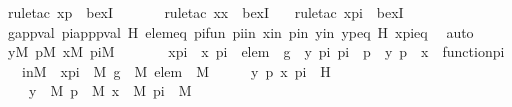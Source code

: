 \begin{isabellebody}
\ {\isacharparenleft}{\kern0pt}rule{\isacharunderscore}{\kern0pt}tac\ x{\isacharequal}{\kern0pt}p\ \ bexI{\isacharparenright}{\kern0pt}\ \isanewline
\ \ \ \ \isamarkupfalse%
\ {\isacharparenleft}{\kern0pt}rule{\isacharunderscore}{\kern0pt}tac\ x{\isacharequal}{\kern0pt}x\ \ bexI{\isacharparenright}{\kern0pt}\ \ \isamarkupfalse%
\ {\isacharparenleft}{\kern0pt}rule{\isacharunderscore}{\kern0pt}tac\ x{\isacharequal}{\kern0pt}pi\ \ bexI{\isacharparenright}{\kern0pt}\isanewline
\ \ \ \ \isamarkupfalse%
\ g{\isacharunderscore}{\kern0pt}app{\isacharunderscore}{\kern0pt}val\ pi{\isacharunderscore}{\kern0pt}app{\isacharunderscore}{\kern0pt}p{\isacharunderscore}{\kern0pt}val\ H\ elemeq\ pifun\ piin\ xin\ pin\ yin\ y{\isacharunderscore}{\kern0pt}p{\isacharunderscore}{\kern0pt}eq\ H\ x{\isacharunderscore}{\kern0pt}pi{\isacharunderscore}{\kern0pt}eq\ \isamarkupfalse%
\ auto\isanewline
{}\isamarkupfalse%
\ \isanewline
\ \ \isamarkupfalse%
\ {\isachardoublequoteopen}{\isasymexists}y{\isasymin}M{\isachardot}{\kern0pt}\ {\isasymexists}p{\isasymin}M{\isachardot}{\kern0pt}\ {\isasymexists}x{\isasymin}M{\isachardot}{\kern0pt}\ {\isasymexists}pi{\isasymin}M{\isachardot}{\kern0pt}\ \isanewline
\ \ \ \ \ \ x{\isacharunderscore}{\kern0pt}pi\ {\isacharequal}{\kern0pt}\ {\isacharless}{\kern0pt}x{\isacharcomma}{\kern0pt}\ pi{\isachargreater}{\kern0pt}\ {\isasymand}\ elem\ {\isacharequal}{\kern0pt}\ {\isasymlangle}g\ {\isacharbackquote}{\kern0pt}\ {\isasymlangle}y{\isacharcomma}{\kern0pt}\ pi{\isasymrangle}{\isacharcomma}{\kern0pt}\ pi\ {\isacharbackquote}{\kern0pt}\ p{\isasymrangle}\ {\isasymand}\ {\isasymlangle}y{\isacharcomma}{\kern0pt}\ p{\isasymrangle}\ {\isasymin}\ x\ {\isasymand}\ function{\isacharparenleft}{\kern0pt}pi{\isacharparenright}{\kern0pt}{\isachardoublequoteclose}\isanewline
\ \ \ inM\ {\isacharcolon}{\kern0pt}\ {\isachardoublequoteopen}x{\isacharunderscore}{\kern0pt}pi\ {\isasymin}\ M{\isachardoublequoteclose}\ {\isachardoublequoteopen}g\ {\isasymin}\ M{\isachardoublequoteclose}\ {\isachardoublequoteopen}elem\ {\isasymin}\ M{\isachardoublequoteclose}\isanewline
\isanewline
\ \ \isamarkupfalse%
\ \isamarkupfalse%
\ y\ p\ x\ pi\ \ H\ {\isacharcolon}{\kern0pt}\ \isanewline
\ \ \ \ {\isachardoublequoteopen}y\ {\isasymin}\ M{\isachardoublequoteclose}\ {\isachardoublequoteopen}p\ {\isasymin}\ M{\isachardoublequoteclose}\ {\isachardoublequoteopen}x\ {\isasymin}\ M{\isachardoublequoteclose}\ {\isachardoublequoteopen}pi\ {\isasymin}\ M{\isachardoublequoteclose}\ \isanewline

\end{isabellebody}
